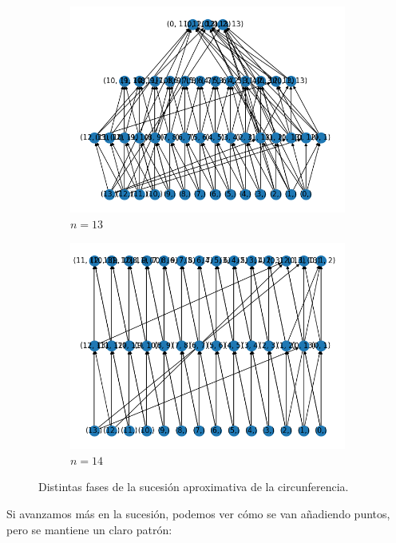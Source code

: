 \begin{figure}[h]
      \begin{subfigure}{.5\textwidth}
        \centering
        \includegraphics[width=.8\linewidth]{13.png}
        \caption{$ n = 13 $}
      \end{subfigure}%
      \begin{subfigure}{.5\textwidth}
        \centering
        \includegraphics[width=.8\linewidth]{14.png}
        \caption{$ n = 14 $}
      \end{subfigure}
    \caption{Distintas fases de la sucesión aproximativa de la circunferencia.}
    \label{circunferencia}
\end{figure}
\newpage
Si avanzamos más en la sucesión, podemos ver cómo se van a\~nadiendo puntos, pero se mantiene un claro patrón:
